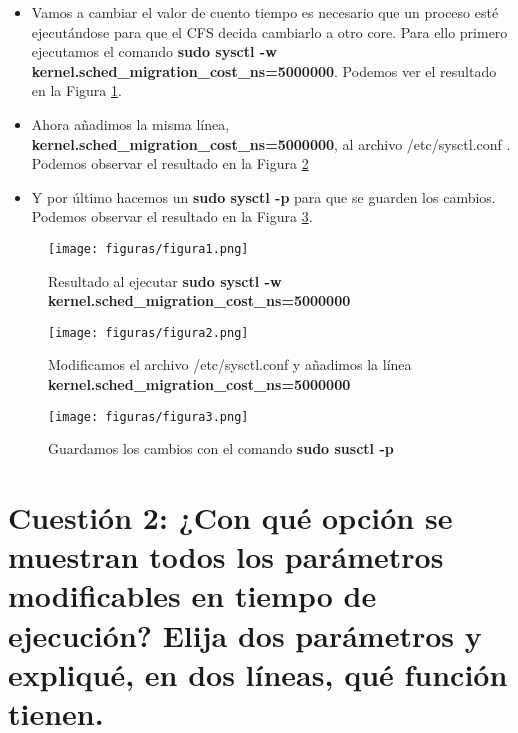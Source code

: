 \begin{itemize}
	\item Vamos a cambiar el valor de cuento tiempo es necesario que un proceso esté ejecutándose para que el CFS decida cambiarlo a otro core. Para ello primero ejecutamos el comando \textbf{sudo sysctl -w kernel.sched\_migration\_cost\_ns=5000000}. Podemos ver el resultado en la Figura \ref{figura1}.
	\item Ahora añadimos la misma línea, \textbf{kernel.sched\_migration\_cost\_ns=5000000}, al archivo /etc/sysctl.conf . Podemos observar el resultado en la Figura \ref{figura2}
	\item Y por último hacemos un \textbf{sudo sysctl -p} para que se guarden los cambios. Podemos observar el resultado en la Figura \ref{figura3}.
\end{itemize}
\begin{figure}[H] %
	\centering
	\texttt{[image: figuras/figura1.png]}  %
	
	
	\caption{Resultado al ejecutar \textbf{sudo sysctl -w kernel.sched\_migration\_cost\_ns=5000000}}
	\label{figura1}
\end{figure}
\begin{figure}[H] %
	\centering
	\texttt{[image: figuras/figura2.png]}  %
	
	
	\caption{Modificamos el archivo /etc/sysctl.conf y añadimos la línea \textbf{kernel.sched\_migration\_cost\_ns=5000000}}
	\label{figura2}
\end{figure}
\begin{figure}[H] %
	\centering
	\texttt{[image: figuras/figura3.png]}  %
	
	
	\caption{Guardamos los cambios con el comando \textbf{sudo susctl -p}}
	\label{figura3}
\end{figure}


\section{Cuestión 2: ¿Con qué opción se muestran todos los parámetros modificables en tiempo de ejecución? Elija dos parámetros y expliqué, en dos líneas, qué función tienen.}

